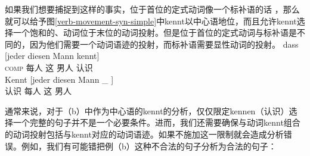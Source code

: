 如果我们想要捕捉到这样的事实，位于首位的定式动词像一个标补语的话 \citep{Hoehle97a}，那么就可以给予图\ref{verb-movement-syn-simple}中kennt以中心语地位，而且允许kennt选择一个饱和的、动词位于末位的动词投射。但是位于首位的定式动词与标补语是不同的，因为他们需要一个动词语迹的投射，而标补语需要显性动词的投射。
\eal
\ex 
\gll dass [jeder diesen Mann kennt]\\
     \textsc{comp} \spacebr{}每人 这 男人 认识\\
\ex 
\gll Kennt [jeder diesen Mann \_ ]\\
	 认识 \spacebr{}每人 这 男人\\
\zl

\noindent
通常来说，对于（b）中作为中心语的kennt的分析，仅仅限定kennen（认识）选择一个完整的句子并不是一个必要条件。进而，我们还需要确保与动词kennt组合的动词投射包括与kennt对应的动词语迹。如果不施加这一限制就会造成分析错误。例如，我们有可能错把例（b）这种不合法的句子分析为合法的句子：
\eal
{}
\zl

